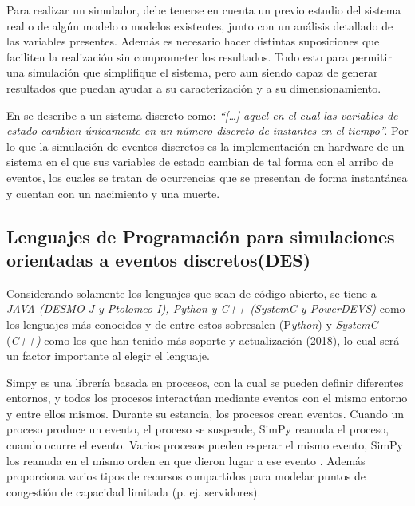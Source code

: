 Para realizar un simulador, debe tenerse en cuenta un previo estudio del sistema real o de algún modelo o modelos existentes, junto con un análisis detallado de las variables presentes. Además es necesario hacer distintas suposiciones que faciliten la realización sin comprometer los resultados. Todo esto para permitir una simulación que simplifique el sistema, pero aun siendo capaz de generar resultados que puedan ayudar a su caracterización y a su dimensionamiento. \newline

En \parencite{Banks2005} se describe a un sistema discreto como: \textit{``[{\dots}] aquel en el cual las variables de estado cambian únicamente en un número discreto de instantes en el tiempo''.} Por lo que la simulación de eventos discretos es la implementación en hardware de un sistema en el que sus variables de estado cambian de tal forma con el arribo de eventos, los cuales se tratan de ocurrencias que se presentan de forma instantánea y cuentan con un nacimiento y una muerte.\newline


\subsection{Lenguajes de Programación para simulaciones orientadas a eventos discretos(DES)}

Considerando solamente los lenguajes que sean de código abierto, se tiene a \textit{JAVA (DESMO-J y Ptolomeo I), Python y C++ (SystemC y PowerDEVS)} como los lenguajes más conocidos y de entre estos sobresalen (P\textit{ython}) y \textit{SystemC }(\textit{C++) }como los que han tenido más soporte y actualización (2018), lo cual será un factor importante al elegir el lenguaje.\newline

Simpy es una librería basada en procesos, con la cual se pueden definir diferentes entornos, y todos los procesos interactúan mediante eventos con el mismo entorno y entre ellos mismos. Durante su estancia, los procesos crean eventos. Cuando un proceso produce un evento, el proceso se suspende, SimPy reanuda el proceso, cuando ocurre el evento. Varios procesos pueden esperar el mismo evento, SimPy los reanuda en el mismo orden en que dieron lugar a ese evento \parencite{Simpy}. Además proporciona varios tipos de recursos compartidos para modelar puntos de congestión de capacidad limitada (p. ej. servidores).\newline

